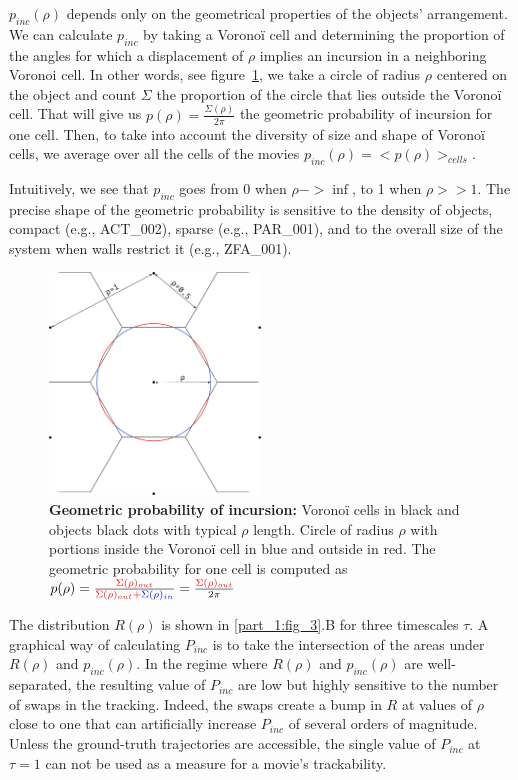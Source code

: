     $p_{inc}(\rho)$ depends only on the geometrical properties of the objects' arrangement. We can calculate $p_{inc}$ by taking a Voronoï cell and determining the proportion of the angles for which a displacement of $\rho$ implies an incursion in a neighboring Voronoi cell. In other words, see figure~\ref{part_1:fig_pinc}, we take a circle of radius $\rho$ centered on the object and count $\Sigma$ the proportion of the circle that lies outside the Voronoï cell. That will give us $p(\rho)=\frac{\Sigma(\rho)}{2\pi}$ the geometric probability of incursion for one cell. Then, to take into account the diversity of size and shape of Voronoï cells, we average over all the cells of the movies $p_{inc}(\rho)=<p(\rho)>_{cells}$.

    Intuitively, we see that $p_{inc}$ goes from 0 when $\rho->\inf$, to 1 when $\rho>>1$. The precise shape of the geometric probability is sensitive to the density of objects, compact (e.g., ACT\_002), sparse (e.g., PAR\_001), and to the overall size of the system when walls restrict it (e.g., ZFA\_001).

	\begin{figure}[h!]
    \centering
    \includegraphics[width=0.5\textwidth]{part_1/assets/Figure_pinc.png}
    \caption{\textbf{Geometric probability of incursion:} Voronoï cells in black and objects black dots with typical $\rho$ length. Circle of radius $\rho$ with portions inside the Voronoï cell in blue and outside in red. The geometric probability for one cell is computed as $p(\rho)=\frac{\color{red}{\Sigma(\rho)_{out}}}{\color{red}{\Sigma(\rho)_{out}} + \color{blue}{\Sigma(\rho)_{in}}} = \frac{\color{red}{\Sigma(\rho)_{out}}}{2\pi}$}
    \label{part_1:fig_pinc}
    \end{figure}

    The distribution $R(\rho)$ is shown in \ref{part_1:fig_3}.B for three timescales $\tau$. A graphical way of calculating $P_{inc}$ is to take the intersection of the areas under $R(\rho)$ and $p_{inc}(\rho)$. In the regime where $R(\rho)$ and $p_{inc}(\rho)$ are well-separated, the resulting value of $P_{inc}$ are low but highly sensitive to the number of swaps in the tracking. Indeed, the swaps create a bump in $R$  at values of $\rho$ close to one that can artificially increase $P_{inc}$ of several orders of magnitude. Unless the ground-truth trajectories are accessible, the single value of $P_{inc}$ at $\tau=1$ can not be used as a measure for a movie's trackability.

